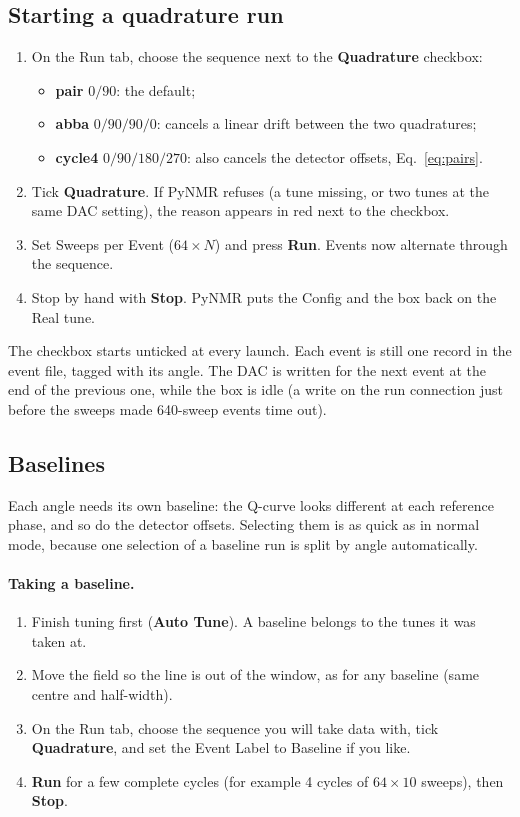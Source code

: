 \documentclass[11pt]{article}
\newcommand{\btn}[1]{\textsf{\textbf{#1}}}   %
\begin{document}
\subsection{Starting a quadrature run}
\begin{enumerate}
\item On the Run tab, choose the sequence next to the \btn{Quadrature} checkbox:
  \begin{itemize}
  \item \textbf{pair} $0/90$: the default;
  \item \textbf{abba} $0/90/90/0$: cancels a linear drift between the two quadratures;
  \item \textbf{cycle4} $0/90/180/270$: also cancels the detector offsets, Eq.~\eqref{eq:pairs}.
  \end{itemize}
\item Tick \btn{Quadrature}. If PyNMR refuses (a tune missing, or two tunes at the same DAC setting), the
  reason appears in red next to the checkbox.
\item Set Sweeps per Event ($64\times N$) and press \btn{Run}. Events now alternate through the sequence.
\item Stop by hand with \btn{Stop}. PyNMR puts the Config and the box back on the Real tune.
\end{enumerate}
The checkbox starts unticked at every launch. Each event is still one record in the event file, tagged with its
angle. The DAC is written for the next event at the end of the previous one, while the box is idle (a write on
the run connection just before the sweeps made 640-sweep events time out).

\subsection{Baselines}
\label{sec:baselines}
Each angle needs its own baseline: the Q-curve looks different at each reference phase, and so do the detector
offsets. Selecting them is as quick as in normal mode, because one selection of a baseline run is split by angle
automatically.

\paragraph{Taking a baseline.}
\begin{enumerate}
\item Finish tuning first (\btn{Auto Tune}). A baseline belongs to the tunes it was taken at.
\item Move the field so the line is out of the window, as for any baseline (same centre and half-width).
\item On the Run tab, choose the sequence you will take data with, tick \btn{Quadrature}, and set the Event Label
  to Baseline if you like.
\item \btn{Run} for a few complete cycles (for example 4 cycles of $64\times10$ sweeps), then \btn{Stop}.
\end{enumerate}
\end{document}
